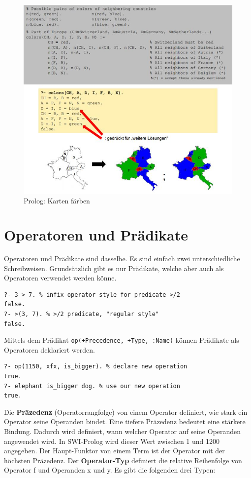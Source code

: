 \begin{figure}[h!]
\centering
\includegraphics[width=1\linewidth]{fig/prolog-karten-faerben}
\caption{Prolog: Karten färben}
\label{fig:prolog-karten-faerben}
\end{figure}

\newpage
\section{Operatoren und Prädikate}
Operatoren und Prädikate sind dasselbe. Es sind einfach zwei unterschiedliche Schreibweisen. Grundsätzlich gibt es nur Prädikate, welche aber auch als Operatoren verwendet werden könne.

\begin{lstlisting}[caption=Prädikat >/2]
?- 3 > 7. % infix operator style for predicate >/2
false.
?- >(3, 7). % >/2 predicate, "regular style"
false.
\end{lstlisting}

Mittels dem Prädikat \verb|op(+Precedence, +Type, :Name)| können Prädikate als Operatoren deklariert werden.

\begin{lstlisting}[caption=is\_bigger/2 als Operator]
?- op(1150, xfx, is_bigger). % declare new operation
true.
?- elephant is_bigger dog. % use our new operation
true.
\end{lstlisting}

Die \textbf{Präzedenz} (Operatorrangfolge) von einem Operator definiert, wie stark ein Operator seine Operanden bindet. Eine tiefere Präzedenz bedeutet eine stärkere Bindung. Dadurch wird definiert, wann welcher Operator auf seine Operanden angewendet wird. In SWI-Prolog wird dieser Wert zwischen 1 und 1200 angegeben. Der Haupt-Funktor von einem Term ist der Operator mit der höchsten Präzedenz. Der \textbf{Operator-Typ} definiert die relative Reihenfolge von Operator f und Operanden x und y. Es gibt die folgenden drei Typen:

